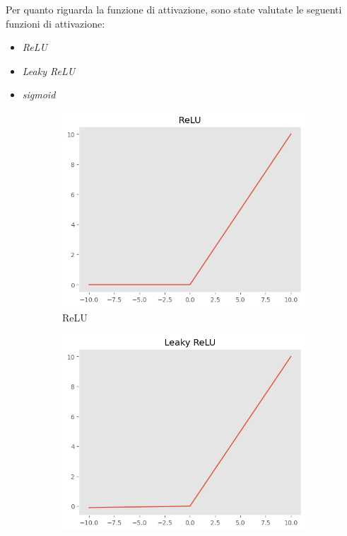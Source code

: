 Per quanto riguarda la funzione di attivazione, sono state valutate le seguenti
funzioni di attivazione:
\begin{itemize}
    \item \textit{ReLU}
    \item \textit{Leaky ReLU}
    \item \textit{sigmoid}
\end{itemize}

\begin{figure}[!ht]
    \centering
    \begin{subfigure}[b]{0.3\textwidth}
        \centering
        \includegraphics[width=\textwidth]{img/rete/relu.png}
        \caption{ReLU}
        \label{fig:relu}
    \end{subfigure}
    \hfill
    \begin{subfigure}[b]{0.3\textwidth}
        \centering
        \includegraphics[width=\textwidth]{img/rete/leaky_relu.png}

\end{subfigure}
\end{figure}
